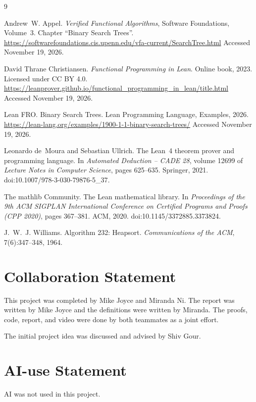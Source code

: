 \documentclass[10pt]{article}
\begin{document}
\begin{thebibliography}{9}

Andrew~W. Appel.
\newblock \emph{Verified Functional Algorithms}, Software Foundations, Volume~3.
\newblock Chapter ``Binary Search Trees''.
\newblock \url{https://softwarefoundations.cis.upenn.edu/vfa-current/SearchTree.html}
\newblock Accessed November 19, 2026.

David Thrane Christiansen.
\newblock \emph{Functional Programming in Lean}.
\newblock Online book, 2023. Licensed under CC BY 4.0.
\newblock \url{https://leanprover.github.io/functional_programming_in_lean/title.html}
\newblock Accessed November 19, 2026.

Lean FRO.
\newblock Binary Search Trees.
\newblock Lean Programming Language, Examples, 2026.
\newblock \url{https://lean-lang.org/examples/1900-1-1-binary-search-trees/}
\newblock Accessed November 19, 2026.

Leonardo de~Moura and Sebastian Ullrich.
\newblock The {Lean}~4 theorem prover and programming language.
\newblock In \emph{Automated Deduction -- CADE 28}, volume 12699 of
  \emph{Lecture Notes in Computer Science}, pages 625--635. Springer, 2021.
\newblock doi:{10.1007/978-3-030-79876-5\_37}.

The mathlib Community.
\newblock The {Lean} mathematical library.
\newblock In \emph{Proceedings of the 9th ACM SIGPLAN International Conference
  on Certified Programs and Proofs (CPP 2020)}, pages 367--381. ACM, 2020.
\newblock doi:{10.1145/3372885.3373824}.

J.~W.~J. Williams.
\newblock Algorithm 232: Heapsort.
\newblock \emph{Communications of the ACM}, 7(6):347--348, 1964.

\end{thebibliography}

\section*{Collaboration Statement}

This project was completed by Mike Joyce and Miranda Ni. The report was written by Mike Joyce and the definitions were written by Miranda. The  proofs, code, report, and video were done by both teammates as a joint effort.

The initial project idea was discussed and advised by Shiv Gour. 

\section*{AI-use Statement}

AI was not used in this project.
\end{document}
